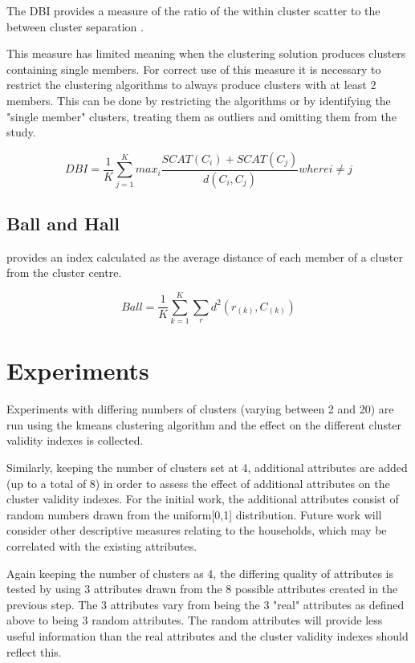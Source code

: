 \documentclass[conference]{IEEEtran}
\begin{document}
The DBI provides a measure of the ratio of the within cluster scatter to the between cluster separation \cite{davies1979cluster}. 

This measure has limited meaning when the clustering solution produces clusters containing single members. For correct use of this measure it is necessary to restrict the clustering algorithms to always produce clusters with at least 2 members. This can be done by restricting the algorithms or by identifying the "single member" clusters, treating them as outliers and omitting them from the study.

\begin{equation}
DBI = \frac{1}{K} \sum\limits_{j=1}^K max_i \frac{SCAT(C_i) + SCAT(C_j)}{d(C_i, C_j)}
where i \neq j
\end{equation}

\subsection{Ball and Hall} 
\cite{ball1965isodata} provides an index calculated as the average distance of each member of a cluster from the cluster centre.

\begin{equation}
Ball =  \frac{1}{K} \sum\limits_{k=1}^K \sum\limits_r d^2 (r_{(k)}, C_{(k)})
\label{equation-ball}
\end{equation}

\section{Experiments}

Experiments with differing numbers of clusters (varying between 2 and 20) are run using the kmeans clustering algorithm and the effect on the different cluster validity indexes is collected.

Similarly, keeping the number of clusters set at 4, additional attributes are added (up to a total of 8) in order to assess the effect of additional attributes on the cluster validity indexes. For the initial work, the additional attributes consist of random numbers drawn from the uniform[0,1] distribution. Future work will consider other descriptive measures relating to the households, which may be correlated with the existing attributes.

Again keeping the number of clusters as 4, the differing quality of attributes is tested by using 3 attributes drawn from the 8 possible attributes created in the previous step. The 3 attributes vary from being the 3 "real" attributes as defined above to being 3 random attributes. The random attributes will provide less useful information than the real attributes and the cluster validity indexes should reflect this.
\end{document}
